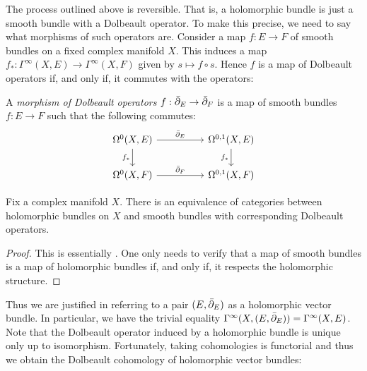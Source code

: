 \documentclass[12pt]{ociamthesis}  %
\begin{document}
The process outlined above is reversible. That is, a holomorphic
bundle is just a smooth bundle with a Dolbeault operator. To make
this precise, we need to say what morphisms of such operators are.
Consider a map $f : E \to F$ of smooth bundles on a fixed complex
manifold $X$. This induces a map
$f_*:\Gamma^\infty(X,E)\to\Gamma^\infty(X,F)$
given by $s \mapsto f\circ s$. Hence $f$ is a map of Dolbeault operators
if, and only if, it commutes with the operators:

\begin{definition}
  A \emph{morphism of Dolbeault operators} $f : {\bar{\partial}}_E \to {\bar{\partial}}_F$
  is a map of smooth bundles $f : E\to F$ such that the following commutes:
  \begin{equation*}
    \begin{tikzcd}
      {\Omega^0(X,E)} && {\Omega^{0,1}(X,E)} \\
      {\Omega^0(X,F)} && {\Omega^{0,1}(X,F)}
      \arrow["{\bar\partial_E}", from=1-1, to=1-3]
      \arrow["{f_*}"', from=1-1, to=2-1]
      \arrow["{f_*}"', from=1-3, to=2-3]
      \arrow["{\bar\partial_F}", from=2-1, to=2-3]
    \end{tikzcd}
  \end{equation*}
\end{definition}

\begin{theorem}
  Fix a complex manifold $X$. There is an equivalence of categories
  between holomorphic bundles on $X$ and smooth bundles with corresponding
  Dolbeault operators.
  \begin{proof}
    This is essentially \cite[Theorem 3.2]{moroianu2004}. One only
    needs to verify that a map of smooth bundles is a map of
    holomorphic bundles if, and only if, it respects the holomorphic
    structure. 
  \end{proof}
\end{theorem}

Thus we are justified in referring to a pair $(E,{\bar{\partial}}_E)$ as a
holomorphic vector bundle. In particular, we have the trivial
equality $\Gamma^\infty(X,(E,{\bar{\partial}}_E)) = \Gamma^\infty(X,E)$.
Note that the Dolbeault operator induced by a holomorphic bundle is
unique only up to isomorphism. Fortunately, taking cohomologies
is functorial and thus we obtain the Dolbeault cohomology of
holomorphic vector bundles:
\end{document}
